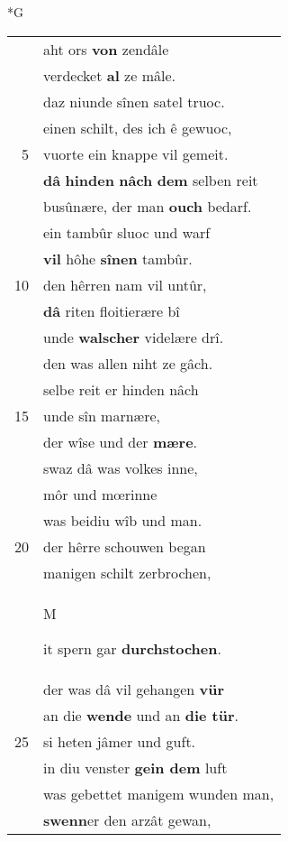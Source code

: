 \documentclass[8pt,a4paper,notitlepage]{article}
\begin{document}
\newpage
\begin{table}[ht]
\begin{minipage}[t]{0.5\linewidth}
\small
\begin{center}*G
\end{center}
\begin{tabular}{rl}
 & aht ors \textbf{von} zendâle\\ 
 & verdecket \textbf{al} ze mâle.\\ 
 & daz niunde sînen satel truoc.\\ 
 & einen schilt, des ich ê gewuoc,\\ 
5 & vuorte ein knappe vil gemeit.\\ 
 & \textbf{dâ} \textbf{hinden} \textbf{nâch} \textbf{dem} selben reit\\ 
 & busûnære, der man \textbf{ouch} bedarf.\\ 
 & ein tambûr sluoc und warf\\ 
 & \textbf{vil} hôhe \textbf{sînen} tambûr.\\ 
10 & den hêrren nam vil untûr,\\ 
 & \textbf{dâ} riten floitierære bî\\ 
 & unde \textbf{walscher} videlære drî.\\ 
 & den was allen niht ze gâch.\\ 
 & selbe reit er hinden nâch\\ 
15 & unde sîn marnære,\\ 
 & der wîse und der \textbf{mære}.\\ 
 & swaz dâ was volkes inne,\\ 
 & môr und mœrinne\\ 
 & was beidiu wîb und man.\\ 
20 & der hêrre schouwen began\\ 
 & manigen schilt zerbrochen,\\ 
 & \begin{large}M\end{large}it spern gar \textbf{durchstochen}.\\ 
 & der was dâ vil gehangen \textbf{vür}\\ 
 & an die \textbf{wende} und an \textbf{die tür}.\\ 
25 & si heten jâmer und guft.\\ 
 & in diu venster \textbf{gein dem} luft\\ 
 & was gebettet manigem wunden man,\\ 
 & \textbf{swenn}er den arzât gewan,\\ 

\end{tabular}
\end{minipage}
\end{table}
\end{document}
